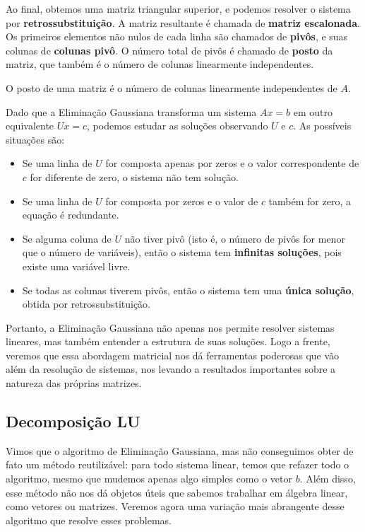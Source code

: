 \documentclass[11pt, a4paper]{article}
\begin{document}
Ao final, obtemos uma matriz triangular superior, e podemos resolver o sistema por \textbf{retrossubstituição}. A matriz resultante é chamada de \textbf{matriz escalonada}. Os primeiros elementos não nulos de cada linha são chamados de \textbf{pivôs}, e suas colunas de \textbf{colunas pivô}. O número total de pivôs é chamado de \textbf{posto} da matriz, que também é o número de colunas linearmente independentes.

O posto de uma matriz é o número de colunas linearmente independentes de \(A\).

Dado que a Eliminação Gaussiana transforma um sistema \(Ax = b\) em outro equivalente \(Ux = c\), podemos estudar as soluções observando \(U\) e \(c\). As possíveis situações são:

\begin{itemize}
    \item Se uma linha de \(U\) for composta apenas por zeros e o valor correspondente de \(c\) for diferente de zero, o sistema não tem solução.
    \item Se uma linha de \(U\) for composta por zeros e o valor de \(c\) também for zero, a equação é redundante.
    \item Se alguma coluna de \(U\) não tiver pivô (isto é, o número de pivôs for menor que o número de variáveis), então o sistema tem \textbf{infinitas soluções}, pois existe uma variável livre.
    \item Se todas as colunas tiverem pivôs, então o sistema tem uma \textbf{única solução}, obtida por retrossubstituição.
\end{itemize}

Portanto, a Eliminação Gaussiana não apenas nos permite resolver sistemas lineares, mas também entender a estrutura de suas soluções. Logo a frente, veremos que essa abordagem matricial nos dá ferramentas poderosas que vão além da resolução de sistemas, nos levando a resultados importantes sobre a natureza das próprias matrizes.

\subsection{Decomposição LU}

Vimos que o algoritmo de Eliminação Gaussiana, mas não conseguimos obter de fato um método reutilizável: para todo sistema linear, temos que refazer todo o algoritmo, mesmo que mudemos apenas algo simples como o vetor \(b\). Além disso, esse método não nos dá objetos úteis que sabemos trabalhar em álgebra linear, como vetores ou matrizes. Veremos agora uma variação mais abrangente desse algoritmo que resolve esses problemas.
\end{document}
